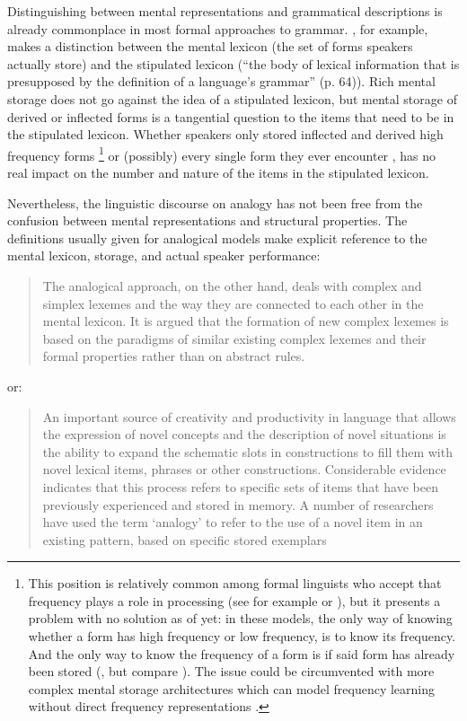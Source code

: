 Distinguishing between mental representations and grammatical descriptions is already commonplace in most formal approaches to grammar. \textcite[p. 63-64]{Stump.2016}, for example, makes a distinction between the mental lexicon (the set of forms speakers actually store) and the stipulated lexicon (``the body of lexical information that is presupposed by the definition of a language's grammar'' (p. 64)). Rich mental storage does not go against the idea of a stipulated lexicon, but mental storage of derived or inflected forms is a tangential question to the items that need to be in the stipulated lexicon. Whether speakers only stored inflected and derived high frequency forms \autocites{Pinker.2002, Ullman.2001, Ullman.2004}\footnote{This position is relatively common among formal linguists who accept that frequency plays a role in processing (see for example \textcite{Stump.2016} or \textcite{Muller.2014}), but it presents a problem with no solution as of yet: in these models, the only way of knowing whether a form has high frequency or low frequency, is to know its frequency. And the only way to know the frequency of a form is if said form has already been stored (\cite{Bybee.2010}, but compare \cite{Baayen.2013a}). The issue could be circumvented with more complex mental storage architectures which can model frequency learning without direct frequency representations \autocites{Baayen.2011, Baayen.2011a, Baayen.2010, Baayen.2013a}.} or (possibly) every single form they ever encounter \autocites{Baayen.2007, DeVaan.2007}, has no real impact on the number and nature of the items in the stipulated lexicon.

Nevertheless, the linguistic discourse on analogy has not been free from the confusion between mental representations and structural properties. The definitions usually given for analogical models make explicit reference to the mental lexicon, storage, and actual speaker performance:

\begin{quotation}
  The analogical approach, on the other hand, deals with complex and simplex lexemes and the way they are connected to each other in the mental lexicon. It is argued that the formation of new complex lexemes is based on the paradigms of similar existing complex lexemes and their formal properties rather than on abstract rules. \autocite[p. 1540]{Schlucker.2011}
\end{quotation}

or:

\begin{quotation}
  An important source of creativity and productivity in language that allows the expression of novel concepts and the description of novel situations is the ability to expand the schematic slots in constructions to fill them with novel lexical items, phrases or other constructions. Considerable evidence indicates that this process refers to specific sets of items that have been previously experienced and stored in memory. A number of researchers have used the term `analogy' to refer to the use of a novel item in an existing pattern, based on specific stored exemplars \autocite[p. 57]{Bybee.2010}
\end{quotation}

